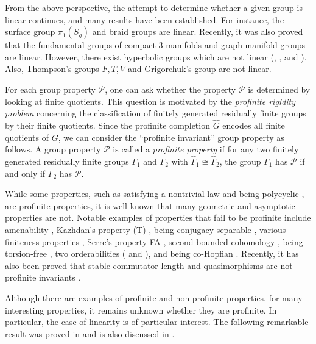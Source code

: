 \documentclass[11pt]{amsart}
\theoremstyle{definition}
\begin{document}
 From the above perspective, the attempt to determine whether a given group is linear continues, and many results have been established.
 For instance, the surface group $\pi_1(S_g)$ and braid groups are linear.
 Recently, it was also proved that the fundamental groups of compact 3-manifolds \cite{wu20263} and graph manifold groups \cite{wise2026linearity} are linear.
 However, there exist hyperbolic groups which are not linear (\cite[Section 8]{MR2175160}, \cite{canary2019new}, and \cite{tholozan2025residually}).
 Also, Thompson's groups $F,T,V$ and Grigorchuk's group are not linear.

 For each group property $\mathcal{P}$, one can ask whether the property $\mathcal{P}$ is determined by looking at finite quotients.
 This question is motivated by the \emph{profinite rigidity problem} concerning the classification of finitely generated residually finite groups by their finite quotients.
 Since the profinite completion $\widehat{G}$ encodes all finite quotients of $G$, we can consider the ``profinite invariant'' group property as follows.
 A group property $\mathcal{P}$ is called a \emph{profinite property} if for any two finitely generated residually finite groups $\Gamma_1$ and $\Gamma_2$ with $\widehat{\Gamma}_1 \cong \widehat{\Gamma}_2$, the group $\Gamma_1$ has $\mathcal{P}$ if and only if $\Gamma_2$ has $\mathcal{P}$.

While some properties, such as satisfying a nontrivial law \cite{bridson2026chasing} and being polycyclic \cite{sabbagh1991polycyclic}, are profinite properties, it is well known that many geometric and asymptotic properties are not.
Notable examples of properties that fail to be profinite include amenability \cite{kionke2023amenability}, 
Kazhdan’s property (T) \cite{aka2012profinite}, 
being conjugacy separable \cite{cotton2012conjugacy}, 
various finiteness properties \cite{lubotzky2014finiteness}, 
Serre’s property FA \cite{cheetham2024property}, 
second bounded cohomology \cite{echtler2024bounded}, 
being torsion-free \cite{bridson2024profinite}, 
two orderabilities (\cite{bridson2024profinite} and \cite{jang2026bi}), and
being co-Hopfian \cite{baik2026co}.
 Recently, it has also been proved that stable commutator length and quasimorphisms are not profinite invariants \cite{fournier2026profinite}.

 Although there are examples of profinite and non-profinite properties, 
 for many interesting properties, it remains unknown whether they are profinite.
 In particular, the case of linearity is of particular interest.
 The following remarkable result was proved in \cite{grothendieck1970representations} and is also discussed in \cite{jaikin2025some}.
\end{document}
